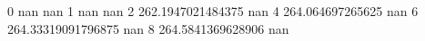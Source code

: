0 nan nan
1 nan nan
2 262.1947021484375 nan
4 264.064697265625 nan
6 264.33319091796875 nan
8 264.5841369628906 nan
